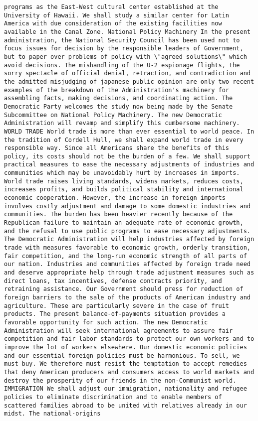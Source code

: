 \documentclass[
]{article}
\begin{document}
\begin{verbatim}
programs as the East-West cultural center established at the University of Hawaii. We shall study a similar center for Latin America with due consideration of the existing facilities now available in the Canal Zone. National Policy Machinery In the present administration, the National Security Council has been used not to focus issues for decision by the responsible leaders of Government, but to paper over problems of policy with \"agreed solutions\" which avoid decisions. The mishandling of the U-2 espionage flights, the sorry spectacle of official denial, retraction, and contradiction and the admitted misjudging of japanese public opinion are only two recent examples of the breakdown of the Administration's machinery for assembling facts, making decisions, and coordinating action. The Democratic Party welcomes the study now being made by the Senate Subcommittee on National Policy Machinery. The new Democratic Administration will revamp and simplify this cumbersome machinery. WORLD TRADE World trade is more than ever essential to world peace. In the tradition of Cordell Hull, we shall expand world trade in every responsible way. Since all Americans share the benefits of this policy, its costs should not be the burden of a few. We shall support practical measures to ease the necessary adjustments of industries and communities which may be unavoidably hurt by increases in imports. World trade raises living standards, widens markets, reduces costs, increases profits, and builds political stability and international economic cooperation. However, the increase in foreign imports involves costly adjustment and damage to some domestic industries and communities. The burden has been heavier recently because of the Republican failure to maintain an adequate rate of economic growth, and the refusal to use public programs to ease necessary adjustments. The Democratic Administration will help industries affected by foreign trade with measures favorable to economic growth, orderly transition, fair competition, and the long-run economic strength of all parts of our nation. Industries and communities affected by foreign trade need and deserve appropriate help through trade adjustment measures such as direct loans, tax incentives, defense contracts priority, and retraining assistance. Our Government should press for reduction of foreign barriers to the sale of the products of American industry and agriculture. These are particularly severe in the case of fruit products. The present balance-of-payments situation provides a favorable opportunity for such action. The new Democratic Administration will seek international agreements to assure fair competition and fair labor standards to protect our own workers and to improve the lot of workers elsewhere. Our domestic economic policies and our essential foreign policies must be harmonious. To sell, we must buy. We therefore must resist the temptation to accept remedies that deny American producers and consumers access to world markets and destroy the prosperity of our friends in the non-Communist world. IMMIGRATION We shall adjust our immigration, nationality and refugee policies to eliminate discrimination and to enable members of scattered families abroad to be united with relatives already in our midst. The national-origins 
\end{verbatim}
\end{document}
